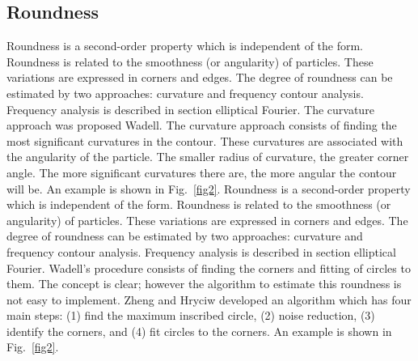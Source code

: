 \documentclass[conference]{IEEEtran}
\begin{document}
\subsection{Roundness}
Roundness is a second-order property which is independent of the form. Roundness is related to the smoothness (or angularity) of particles. These variations are expressed in corners and edges. The degree of roundness can be estimated by two approaches: curvature and frequency contour analysis. Frequency analysis is described in section elliptical Fourier. The curvature approach was proposed Wadell\cite{b6}.  The curvature approach consists of finding the most significant curvatures in the contour. These curvatures are associated with the angularity of the particle. The smaller radius of curvature, the greater corner angle.  The more significant curvatures there are, the more angular the contour will be. An example is shown in Fig.~\ref{fig2}.
Roundness is a second-order property which is independent of the form. Roundness is related to the smoothness (or angularity) of particles. These variations are expressed in corners and edges. The degree of roundness can be estimated by two approaches: curvature and frequency contour analysis. Frequency analysis is described in section elliptical Fourier. Wadell's procedure \cite{b6} consists of finding the corners and fitting of circles to them. The concept is clear; however the algorithm to estimate this roundness is not easy to implement. Zheng and Hryciw \cite{b7} developed an algorithm which has four main steps: (1) find the maximum inscribed circle, (2) noise reduction, (3) identify the corners, and (4) fit circles to the corners. An example is shown in Fig.~\ref{fig2}.
\end{document}
